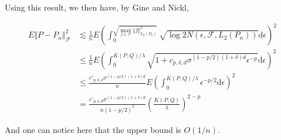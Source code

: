 	Using this result, we then have, by Gine and Nickl,
	
	\begin{align*}
		E \displaystyle\Vert P-P_n\Vert_{\mathcal{F}}^{2}&\lesssim \frac{1}{n}E(\int_{0}^{\sqrt{\max_{f\in \mathcal{F}}\Vert f\Vert_{L_{2}(P_{n})}^{2}}}\sqrt{\log 2N(\epsilon,\mathcal{F},L_{2}(P_{n}))}\mathrm{d}\epsilon)^{2} \\
		&\leq \frac{1}{n}E(\int_{0}^{K(P,Q)/\lambda}\sqrt{1+c_{p,\delta,d} \sigma^{(1-p/2)(1+\delta)d}\epsilon^{-p}}\mathrm{d}\epsilon)^{2} \\
		&\leq \frac{c'_{p,\delta,d} \sigma^{(1-p/2)(1+\delta)d}}{n}E(\int_{0}^{K(P,Q)/\lambda} \epsilon^{-p/2} \mathrm{d}\epsilon)^{2} \\
		&= \frac{c'_{p,\delta,d} \sigma^{(1-p/2)(1+\delta)d}}{n(1-p/2)^2} \left(\frac{K(P,Q)}{\lambda}\right)^{2-p}
	\end{align*}
	
	And one can notice here that the upper bound is $O(1/n)$.